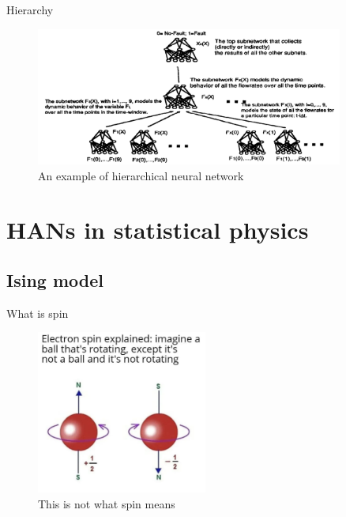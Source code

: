 \documentclass{beamer}
\begin{document}
\begin{frame}{Hierarchy}
    \begin{figure}
        \centering
        \includegraphics[width=0.9\textwidth]{hier.png}
        \caption{An example of hierarchical neural network}
    \end{figure}
\end{frame}

\section{HANs in statistical physics}

\subsection{Ising model}
\begin{frame}{What is spin}
    \begin{figure}
        \centering
        \includegraphics[width=0.5\textwidth]{spin.jpg}\pause
        \caption{This is not what spin means}
    \end{figure}
\end{frame}
\end{document}
